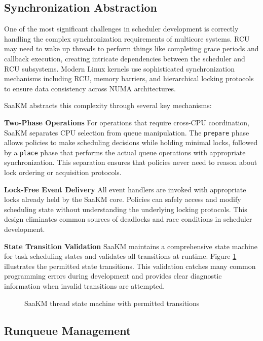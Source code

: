\subsection{Synchronization Abstraction}

One of the most significant challenges in scheduler development is correctly handling the complex synchronization requirements of multicore systems. RCU may need to wake up threads to perform things like completing grace periods and callback execution, creating intricate dependencies between the scheduler and RCU subsystems. Modern Linux kernels use sophisticated synchronization mechanisms including RCU, memory barriers, and hierarchical locking protocols to ensure data consistency across NUMA architectures.

\parspace
SaaKM abstracts this complexity through several key mechanisms:

\parspace
\textbf{Two-Phase Operations} For operations that require cross-CPU coordination, SaaKM separates CPU selection from queue manipulation. The \texttt{prepare} phase allows policies to make scheduling decisions while holding minimal locks, followed by a \texttt{place} phase that performs the actual queue operations with appropriate synchronization. This separation ensures that policies never need to reason about lock ordering or acquisition protocols.

\parspace
\textbf{Lock-Free Event Delivery} All event handlers are invoked with appropriate locks already held by the SaaKM core. Policies can safely access and modify scheduling state without understanding the underlying locking protocols. This design eliminates common sources of deadlocks and race conditions in scheduler development.

\parspace
\textbf{State Transition Validation} SaaKM maintains a comprehensive state machine for task scheduling states and validates all transitions at runtime. Figure \ref{fig:saakm-states} illustrates the permitted state transitions. This validation catches many common programming errors during development and provides clear diagnostic information when invalid transitions are attempted.

\begin{figure}[htbp]
    \centering
    
    \caption{SaaKM thread state machine with permitted transitions}
    \label{fig:saakm-states}
\end{figure}

\subsection{Runqueue Management}

